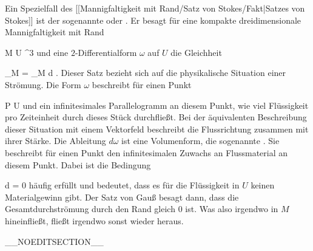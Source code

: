 {

Ein Spezielfall des
[[Mannigfaltigkeit mit Rand/Satz von Stokes/Fakt|Satzes von Stokes]]
ist der sogenannte  {} oder  {.} Er besagt für eine kompakte dreidimensionale Mannigfaltigkeit mit Rand

\mavergleichskette
{\vergleichskette
{ M
}
{ \subset }{ U
}
{ \subseteq }{ \R^3
}
{    }{
}
{   }{
}
}
{}{}{}
 {} {}
und eine $2$-Differentialform $\omega$ auf $U$ die Gleichheit

\mavergleichskettedisp
{\vergleichskette
{ \int_{\partial M} \omega
}
{ =} { \int_M d \omega
}
{ } {
}
{ } {
}
{ } {
}
}
{}{}{.}
Dieser Satz bezieht sich auf die physikalische Situation einer Strömung. Die Form $\omega$ beschreibt für einen Punkt

\mavergleichskette
{\vergleichskette
{ P
}
{ \in }{ U
}
{  }{
}
{    }{
}
{   }{
}
}
{}{}{}
und ein infinitesimales Parallelogramm an diesem Punkt, wie viel Flüssigkeit pro Zeiteinheit durch dieses Stück durchfließt. Bei der äquivalenten Beschreibung dieser Situation mit einem Vektorfeld beschreibt
 die Flussrichtung zusammen mit ihrer Stärke. Die Ableitung $d \omega$ ist eine Volumenform, die sogenannte  {.} Sie beschreibt für einen Punkt den infinitesimalen Zuwachs an Flussmaterial
 {} {}
an diesem Punkt. Dabei ist die Bedingung

\mavergleichskette
{\vergleichskette
{d \omega
}
{ = }{ 0
}
{  }{
}
{    }{
}
{   }{
}
}
{}{}{}
häufig erfüllt und bedeutet, dass es für die Flüssigkeit in $U$ keinen Materialgewinn gibt. Der Satz von Gauß besagt dann, dass die Gesamtdurchströmung durch den Rand
 {} {}
gleich $0$ ist. Was also irgendwo in $M$ hineinfließt, fließt irgendwo sonst wieder heraus.

}


__NOEDITSECTION__

